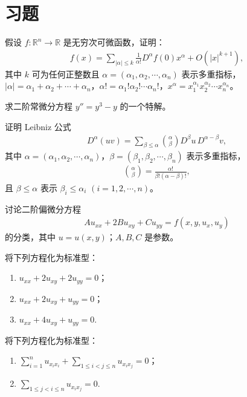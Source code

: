\documentclass[../../main.tex]{subfiles}%
\begin{document}
\section{习题}

\begin{proposition}
假设 $f:\mathbb{R}^n\to\mathbb{R}$ 是无穷次可微函数，证明：
\begin{align*}
f(x) = \sum_{|\alpha|\leqslant k} \frac{1}{\alpha!} D^\alpha f(0)x^\alpha + O(|x|^{k+1}),
\end{align*}
其中 $k$ 可为任何正整数且 $\alpha=(\alpha_1,\alpha_2,\cdots,\alpha_n)$ 表示多重指标，$|\alpha|=\alpha_1+\alpha_2+\cdots+\alpha_n$，$\alpha!=\alpha_1!\alpha_2!\cdots\alpha_n!$，$x^\alpha=x_1^{\alpha_1}x_2^{\alpha_2}\cdots x_n^{\alpha_n}$。
\end{proposition}

\begin{example}
求二阶常微分方程 $y''=y^3-y$ 的一个特解。
\end{example}

\begin{proposition}
证明 Leibniz 公式
\begin{align*}
D^\alpha(uv) = \sum_{\beta\leqslant \alpha} \binom{\alpha}{\beta} D^\beta u\,D^{\alpha-\beta}v,
\end{align*}
其中 $\alpha=(\alpha_1,\alpha_2,\cdots,\alpha_n)$，$\beta=(\beta_1,\beta_2,\cdots,\beta_n)$ 表示多重指标，
\begin{align*}
\binom{\alpha}{\beta} = \frac{\alpha!}{\beta!(\alpha-\beta)!},
\end{align*}
且 $\beta\leqslant\alpha$ 表示 $\beta_i\leqslant\alpha_i$ $(i=1,2,\cdots,n)$。
\end{proposition}

\begin{example}
讨论二阶偏微分方程
\begin{align*}
A u_{xx} + 2B u_{xy} + C u_{yy} = f(x,y,u_x,u_y)
\end{align*}
的分类，其中 $u=u(x,y)$；$A,B,C$ 是参数。
\end{example}

\begin{example}
将下列方程化为标准型：
\begin{enumerate}[(1)]
\item $u_{xx} + 2u_{xy} + 2u_{yy} = 0$；
\item $u_{xx} + 2u_{xy} + u_{yy} = 0$；
\item $u_{xx} + 4u_{xy} + u_{yy} = 0$.
\end{enumerate}
\end{example}

\begin{example}
将下列方程化为标准型：
\begin{enumerate}[(1)]
\item $\sum_{i=1}^n u_{x_i x_i} + \sum_{1\leqslant i < j \leqslant n} u_{x_i x_j} = 0$；
\item $\sum_{1\leqslant j < i \leqslant n} u_{x_i x_j} = 0$.
\end{enumerate}
\end{example}
\end{document}
